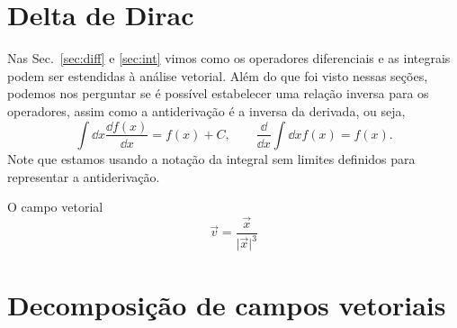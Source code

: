 \section{Delta de Dirac}

Nas Sec.~\ref{sec:diff} e \ref{sec:int} vimos como os operadores diferenciais e
as integrais podem ser estendidas à análise vetorial. Além do que foi visto
nessas seções, podemos nos perguntar se é possível estabelecer uma relação
inversa para os operadores, assim como a antiderivação é a inversa da derivada,
ou seja,
\begin{equation}
	\int \dd x \frac{\dd f(x)}{\dd x} = f(x) + C, \qquad \frac{\dd}{\dd x}\int\dd x f(x) = f(x).
\end{equation}
Note que estamos usando a notação da integral sem limites definidos para
representar a antiderivação.


O campo vetorial
\begin{equation}
	\vec{v} = 	\frac{\vec{x}}{\vert\vec{x}\vert^3}
\end{equation}

\section{Decomposição de campos vetoriais}

\listofexercises


